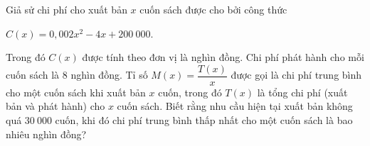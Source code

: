 \begin{bt}%
Giả sử chi phí cho xuất bản $x$ cuốn sách được cho bởi công thức 
\begin{center}
	$C(x)=0{,}002x^2-4x+200\ 000$.
\end{center} 
Trong đó  $C(x)$ được tính theo đơn vị là nghìn đồng. Chi phí phát hành cho mỗi cuốn sách là $8$ nghìn đồng. Tỉ số $M(x)=\dfrac{T(x)}{x}$ được gọi là chi phí trung bình cho một cuốn sách khi xuất bản $x$ cuốn, trong đó $T(x)$ là tổng chi phí (xuất bản và phát hành) cho $x$ cuốn sách. Biết rằng nhu cầu hiện tại xuất bản không quá $30\ 000$ cuốn, khi đó chi phí trung bình thấp nhất cho một cuốn sách là bao nhiêu nghìn đồng?
\end{bt}

